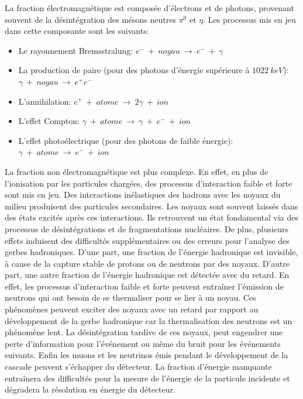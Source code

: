 La fraction électromagnétique est composée d'électrons et de photons, provenant souvent de la désintégration des mésons neutres $\pi^{0}$ et $\eta$. Les processus mis en jeu dans cette composante sont les suivants:  
\begin{itemize}
\item Le rayonnement Bremsstralung: $e^-~+~noyau~\rightarrow~e^-~+~\gamma$ 
\item La production de paire (pour des photons d'énergie supérieure à $1022\ keV$): $\gamma~+~noyau~\rightarrow~e^+e^-$  
\item L'annihilation: $e^+~+~atome~\rightarrow~2\gamma~+~ion$
\item L'effet Compton: $\gamma~+~atome~\rightarrow~\gamma~+~e^-~+~ion$
\item L'effet photoélectrique (pour des photons de faible énergie): $\gamma~+~atome~\rightarrow~e^-~+~ion$ 
\end{itemize}
La fraction non électromagnétique est plus complexe. En effet, en plus de l’ionisation par les particules chargées, des processus d'interaction faible et forte sont mis en jeu. Des interactions inélastiques des hadrons avec les noyaux du milieu produisent des particules secondaires. Les noyaux sont souvent laissés dans des états excités après ces interactions. Ils retrouvent un état fondamental via des processus de désintégrations et de fragmentations nucléaires. De plus, plusieurs effets induisent des difficultés supplémentaires ou des erreurs pour l'analyse des gerbes hadroniques. D'une part, une fraction de l'énergie hadronique est invisible, à cause de la capture stable de protons ou de neutrons par des noyaux. 
D'autre part, une autre fraction de l'énergie hadronique est détectée avec du retard. En effet, les processus d'interaction faible et forte peuvent entraîner l'émission de neutrons qui ont besoin de se thermaliser pour se lier à un noyau. Ces phénomènes peuvent exciter des noyaux avec un retard par rapport au développement de la gerbe hadronique car la thermalisation des neutrons est un phénomène lent. La désintégration tardive de ces noyaux, peut engendrer une perte d'information pour l’événement ou même du bruit pour les événements suivants. Enfin les muons et les neutrinos émis pendant le développement de la cascade peuvent s'échapper du détecteur. La fraction d'énergie manquante entraînera des difficultés pour la mesure de l'énergie de la particule incidente et dégradera la résolution en énergie du détecteur.
